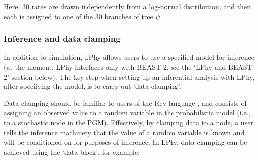 \documentclass[10pt,letterpaper,table]{article}
\begin{document}
Here, 30 rates are drawn independently from a log-normal distribution, and then each is assigned to one of the 30 branches of tree $\psi$.

\subsubsection{Inference and data clamping}
\label{sec:dataclamping}
In addition to simulation, LPhy allows users to use a specified model for inference (at the moment, LPhy interfaces only with BEAST 2, see the `LPhy and BEAST 2' section below). The key step when setting up an inferential analysis with LPhy, after specifying the model, is to carry out `data clamping'.

Data clamping should be familiar to users of the Rev language \cite{revbayes}, and consists of assigning an observed value to a random variable in the probabilistic model (i.e., to a stochastic node in the PGM). Effectively, by clamping data to a node, a user tells the inference machinery that the value of a random variable is known and will be conditioned on for purposes of inference. In LPhy, data clamping can be achieved using the `data block', for example:
\end{document}
